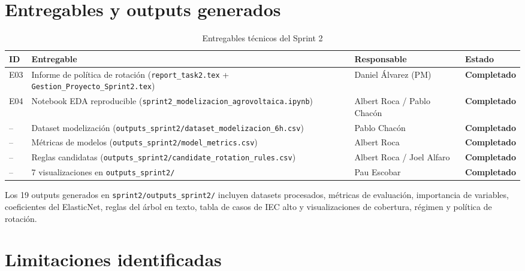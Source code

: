 \documentclass[12pt,a4paper]{article}
\newcommand{\done}{\textcolor{completed}{\textbf{Completado}}}
\begin{document}
\section{Entregables y outputs generados}

\begin{table}[H]
\centering
\caption{Entregables técnicos del Sprint 2}
\label{tab:entregables}
\renewcommand{\arraystretch}{1.3}
\begin{tabularx}{\textwidth}{llXl}
\toprule
\textbf{ID} & \textbf{Entregable} & \textbf{Responsable} & \textbf{Estado} \\
\midrule
E03
  & Informe de política de rotación (\texttt{report\_task2.tex} + \texttt{Gestion\_Proyecto\_Sprint2.tex})
  & Daniel Álvarez (PM)
  & \done \\
E04
  & Notebook EDA reproducible (\texttt{sprint2\_modelizacion\_agrovoltaica.ipynb})
  & Albert Roca / Pablo Chacón
  & \done \\
--
  & Dataset modelización (\texttt{outputs\_sprint2/dataset\_modelizacion\_6h.csv})
  & Pablo Chacón
  & \done \\
--
  & Métricas de modelos (\texttt{outputs\_sprint2/model\_metrics.csv})
  & Albert Roca
  & \done \\
--
  & Reglas candidatas (\texttt{outputs\_sprint2/candidate\_rotation\_rules.csv})
  & Albert Roca / Joel Alfaro
  & \done \\
--
  & 7 visualizaciones en \texttt{outputs\_sprint2/}
  & Pau Escobar
  & \done \\
\bottomrule
\end{tabularx}
\end{table}

Los 19 outputs generados en \texttt{sprint2/outputs\_sprint2/} incluyen datasets procesados, métricas de evaluación, importancia de variables, coeficientes del ElasticNet, reglas del árbol en texto, tabla de casos de IEC alto y visualizaciones de cobertura, régimen y política de rotación.

\newpage
\section{Limitaciones identificadas}
\end{document}

